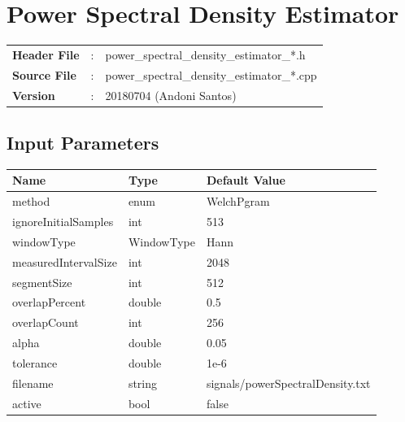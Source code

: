 \clearpage

\section{Power Spectral Density Estimator}

\begin{refsection}

\begin{tcolorbox}	
	\begin{tabular}{p{2.75cm} p{0.2cm} p{10.5cm}} 	
		\textbf{Header File}   &:& power\_spectral\_density\_estimator\_*.h \\
		\textbf{Source File}   &:& power\_spectral\_density\_estimator\_*.cpp \\
		\textbf{Version}	   &:& 20180704 (Andoni Santos)
	\end{tabular}
\end{tcolorbox}

\subsection*{Input Parameters}

\begin{table}[H]
	\centering
	\begin{tabular}{|l|l|l|}
		\hline
		\textbf{Name}  		 & \textbf{Type}  & \textbf{Default Value}    	\\\hline
		method				& enum				& WelchPgram			\\\hline
		ignoreInitialSamples & int				& 513					\\\hline
		windowType			 & WindowType     & Hann			  	\\\hline
		measuredIntervalSize & int 			  & 2048				\\\hline
		segmentSize			 & int			  & 512					\\\hline
		overlapPercent 		 & double 		& 0.5					\\\hline
		overlapCount		& int			& 256					\\\hline
		alpha				& double		& 0.05					\\\hline
		tolerance			& double		& 1e-6					\\\hline
		filename			& string			& signals/powerSpectralDensity.txt	\\\hline
		active         & bool        & false\\\hline
	\end{tabular}
\end{table}



\end{refsection}
